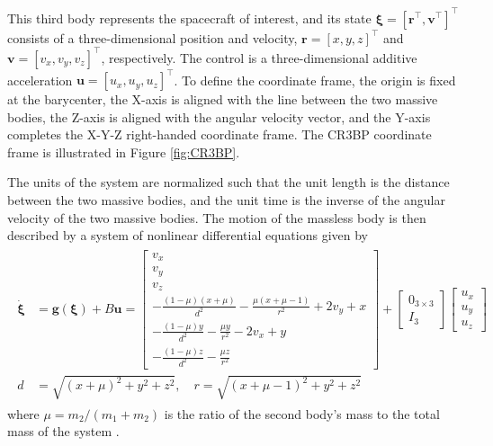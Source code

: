 This third body represents the spacecraft of interest, and its state $\bm{\xi} = [\bm{r}^\top, \bm{v}^\top]^\top$ consists of a three-dimensional position and velocity, $\bm{r} = [x, y, z]^\top$ and $\bm{v} = [v_x, v_y, v_z]^\top$, respectively. The control is a three-dimensional additive acceleration $\bm{u} = [u_x, u_y, u_z]^\top$. To define the coordinate frame, the origin is fixed at the barycenter, the X-axis is aligned with the line between the two massive bodies, the Z-axis is aligned with the angular velocity vector, and the Y-axis completes the X-Y-Z right-handed coordinate frame. The CR3BP coordinate frame is illustrated in Figure \ref{fig:CR3BP}. 

The units of the system are normalized such that the unit length is the distance between the two massive bodies, and the unit time is the inverse of the angular velocity of the two massive bodies. The motion of the massless body is then described by a system of nonlinear differential equations given by 
\begin{align}
\begin{aligned}
    \dot{\bm{\xi}} &= \bm{g}(\bm{\xi}) + B\bm{u}= \begin{bmatrix}
        v_x \\
        v_y \\
        v_z \\
        -\frac{(1 - \mu)(x + \mu)}{d^2} - \frac{\mu(x + \mu - 1)}{r^2} + 2v_y + x\\
        -\frac{(1 - \mu)y}{d^2} - \frac{\mu y}{r^2} - 2v_x + y\\
        -\frac{(1 - \mu)z}{d^2} - \frac{\mu z}{r^2}
    \end{bmatrix} + \begin{bmatrix}
        0_{3 \times 3} \\
        I_3
    \end{bmatrix} \begin{bmatrix}
        u_x \\
        u_y \\
        u_z
    \end{bmatrix} \\
    d &= \sqrt{(x+\mu)^2 + y^2 + z^2}, \quad r = \sqrt{(x + \mu - 1)^2 + y^2 + z^2} \label{eq:CR3BP-dynamics}
\end{aligned}
\end{align}
\noindent where $\mu = m_2/(m_1 + m_2)$ is the ratio of the second body's mass to the total mass of the system \cite{zimovan2017characteristics}.

